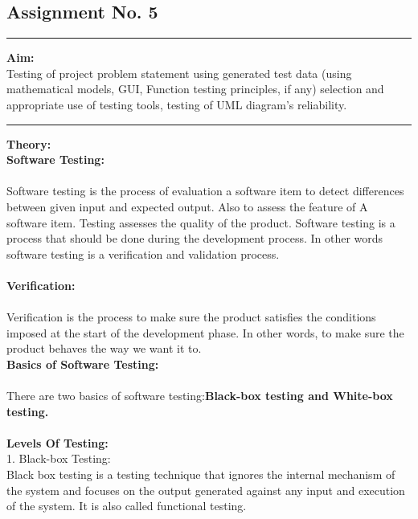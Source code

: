 \documentclass[11pt,a4paper]{report}
\begin{document}
\begin{center}
\section*{Assignment No. 5}
\end{center}
\rule{\textwidth}{1pt}
\textbf{Aim:\\}Testing of project problem statement using generated test data (using mathematical models, GUI, Function testing principles, if any) selection and appropriate use of testing tools, testing of UML diagram's reliability.\\
\rule{\textwidth}{1pt}
\textbf{Theory:\\}
\textbf{Software Testing:\\}
\paragraph{}Software testing is the process of evaluation a software item to detect differences between given input and expected output. Also to assess the feature of A software item. Testing assesses the quality of the product. Software testing is a process that should be done during the development process. In other words software testing is a verification and validation process.\\
\textbf{\\Verification:\\}
\paragraph{}Verification is the process to make sure the product satisfies the conditions imposed at the start of the development phase. In other words, to make sure the product behaves the way we want it to.\\
\textbf{Basics of Software Testing:\\}
\paragraph{}There are two basics of software testing:\textbf{Black-box testing and White-box testing.}\\

\textbf{\\Levels Of Testing:\\}
1. Black-box Testing:\\
Black box testing is a testing technique that ignores the internal mechanism of the system and focuses on the output generated against any input and execution of the system. It is also called functional testing.\\
\end{document}
